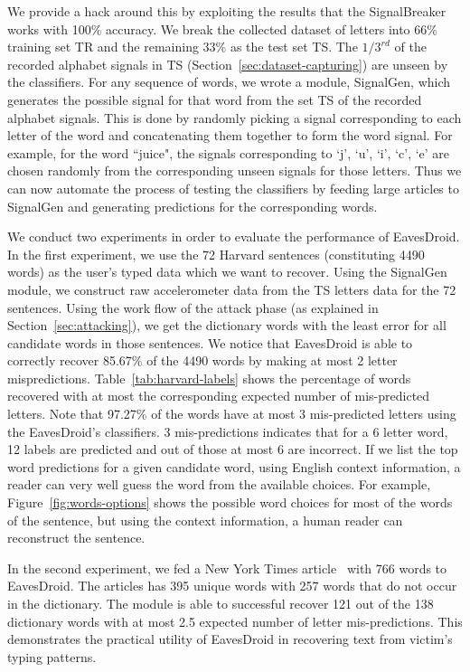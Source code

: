 \documentclass[11pt,conference]{IEEEtran}
\begin{document}
We provide a hack around this by exploiting the results that
the SignalBreaker works with 100\% accuracy. We break the collected dataset of
letters into 66\% training set TR and the remaining 33\% as the test set TS.
The $1/3^{rd}$ of the recorded
alphabet signals in TS (Section~\ref{sec:dataset-capturing}) are unseen by the classifiers.
For any sequence of words, we wrote a module, SignalGen, which generates the possible
signal for that word from the set TS of the recorded alphabet signals.
This is done by randomly picking a signal corresponding to each letter of the word
and concatenating them together to form the word signal. For example, for the word
``juice", the signals corresponding to `j', `u', `i', `c', `e' are chosen randomly
from the corresponding unseen signals for those letters. Thus we can now automate
the process of testing the classifiers by feeding large articles to SignalGen
and generating predictions for the corresponding words.

We conduct two experiments in order to evaluate the performance of EavesDroid.
In the first experiment, we use the 72 Harvard sentences (constituting 4490 words) as the user's typed data
which we want to recover. Using the SignalGen module, we construct raw accelerometer
data from the TS letters data for the 72 sentences. Using the work flow
of the attack phase (as explained in Section~\ref{sec:attacking}), we get the dictionary
words with the least error for all candidate words in those sentences. We notice that
EavesDroid is able to correctly recover 85.67\% of the 4490 words by making at most 2 letter
mispredictions. Table~\ref{tab:harvard-labels}
shows the percentage of words recovered with at most the corresponding expected number of mis-predicted letters.
Note that 97.27\% of the words have at most 3 mis-predicted letters using
the EavesDroid's classifiers. 3 mis-predictions indicates that for a 6 letter word, 12 labels are predicted and out of
those at most 6 are incorrect. If we list the top word predictions for a given candidate word,
using English context information, a reader can very well guess the word from the available
choices. For example, Figure~\ref{fig:words-options} shows the possible word choices
for most of the words of the sentence, but using the context information, a human reader
can reconstruct the sentence.

In the second experiment, we fed a New York Times article~\cite{bats-nytimes} with 766 words
to EavesDroid. The articles has 395 unique words with 257 words that do not occur in the dictionary.
The module is able to successful recover 121 out of the 138 dictionary words with at most 2.5 expected
number of letter mis-predictions. This demonstrates the practical utility of EavesDroid in recovering text
from victim's typing patterns. 
\end{document}
